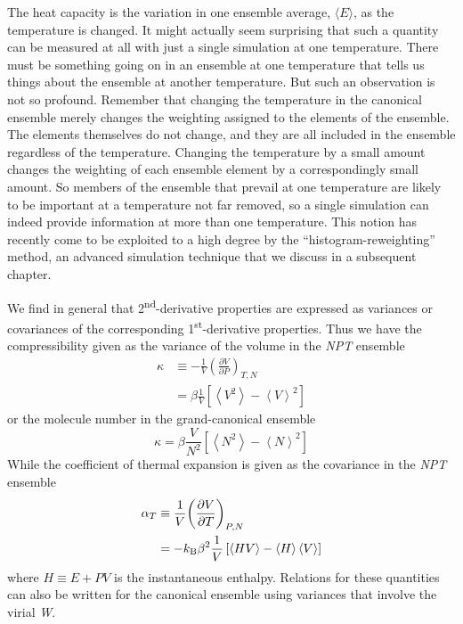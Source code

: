 \documentclass[9pt,bestpractices]{molsim}
\begin{document}
The heat capacity is the variation in one ensemble average, $\langle E\rangle$, as the
temperature is changed. It might actually seem surprising that such a
quantity can be measured at all with just a single simulation at one
temperature. There must be something going on in an ensemble at one
temperature that tells us things about the ensemble at another
temperature. But such an observation is not so profound. Remember that
changing the temperature in the canonical ensemble merely changes the
weighting assigned to the elements of the ensemble. The elements
themselves do not change, and they are all included in the ensemble
regardless of the temperature. Changing the temperature by a small
amount changes the weighting of each ensemble element by a
correspondingly small amount. So members of the ensemble that prevail at
one temperature are likely to be important at a temperature not far
removed, so a single simulation can indeed provide information at more
than one temperature. This notion has recently come to be exploited to a
high degree by the ``histogram-reweighting'' method, an advanced
simulation technique that we discuss in a subsequent chapter.

We find in general that 2\textsuperscript{nd}-derivative properties are
expressed as variances or covariances of the corresponding
1\textsuperscript{st}-derivative properties. Thus we have the
compressibility given as the variance of the volume in the \emph{NPT} ensemble
\begin{align*}
\kappa  &\equiv  - \frac{1}{V}{\left( {\frac{{\partial V}}{{\partial P}}} \right)_{T,N}}\\
 &= \beta \frac{1}{V}\left[ {\left\langle {{V^2}} \right\rangle  - {{\left\langle V \right\rangle }^2}} \right]
\end{align*}
or the molecule number in the grand-canonical ensemble
\[\kappa  = \beta \frac{V}{{{N^2}}}\left[ {\left\langle {{N^2}} \right\rangle  - {{\left\langle N \right\rangle }^2}} \right]\]
While the coefficient of thermal expansion is given as the covariance in
the \emph{NPT} ensemble
\begin{align*}
{\alpha _T} &\equiv \frac{1}{V}{\left( {\frac{{\partial V}}{{\partial T}}} \right)_{P,N}}\\
 &=  - k_{\rm B}{\beta ^2}\frac{1}{V}\left[ {\left\langle {HV} \right\rangle  - \left\langle H \right\rangle \left\langle V \right\rangle } \right]
\end{align*}
where $H \equiv E + PV$ is the instantaneous enthalpy. Relations for these quantities can
also be written for the canonical ensemble using variances that involve
the virial \emph{W}.
\end{document}
